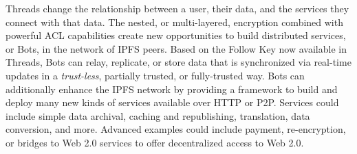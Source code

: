 \documentclass{textile}
\begin{document}
Threads change the relationship between a user, their data, and the services they connect with that data. The nested, or multi-layered, encryption combined with powerful ACL capabilities create new opportunities to build distributed services, or Bots, in the network of IPFS peers. Based on the Follow Key now available in Threads, Bots can relay, replicate, or store data that is synchronized via real-time updates in a \emph{trust-less}, partially trusted, or fully-trusted way. Bots can additionally enhance the IPFS network by providing a framework to build and deploy many new kinds of services available over HTTP or P2P. Services could include simple data archival, caching and republishing, translation, data conversion, and more. Advanced examples could include payment, re-encryption, or bridges to Web 2.0 services to offer decentralized access to Web 2.0.


\nocite{*}

\printbibliography
\end{document}
